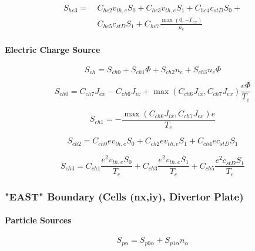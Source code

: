 \documentclass[a4paper,10pt]{report}
\begin{document}
\begin{equation}\begin{split}
S_{he3}= ~ & C_{he2}v_{th,e}S_{0}+C_{he3}v_{th,e}S_{1}+C_{he4}c_{stD}S_{0}+ \\
~ & C_{he5}c_{stD}S_{1}+C_{he7}\frac{\max\left( 0,-\Gamma_{ex}\right) }{n_{e}}
\label{84}
\end{split}\end{equation}

\paragraph{Electric Charge Source}

\begin{equation}
S_{ch}=S_{ch0}+S_{ch1}\Phi+S_{ch2}n_{e}+S_{ch3}n_{e}\Phi   \label{85}
\end{equation}

\begin{equation}
S_{ch0}=C_{ch7}J_{ex}-C_{ch6}J_{ix}+
\max\left(C_{ch6}J_{ix},C_{ch7}J_{ex}\right) \frac{e\Phi}{T_{e}}   \label{86}
\end{equation}
\bigskip

\begin{equation}
S_{ch1}=-\frac{\max\left( C_{ch6}J_{ix},C_{ch7}J_{ex}\right) e}{T_{e}}   \label{87}
\end{equation}

\begin{equation}
S_{ch2}=C_{ch0}ev_{th,e}S_{0}+C_{ch2}ev_{th,e}S_{1}+C_{ch4}ec_{stD}S_{1}
\label{88}
\end{equation}

\begin{equation}
S_{ch3}=C_{ch1}\frac{e^{2}v_{th,e}S_{0}}{T_{e}}+C_{ch3}
\frac{e^{2}v_{th,e}S_{1}}{T_{e}}+C_{ch5}\frac{e^{2}c_{stD}S_{1}}{T_{e}}   \label{89}
\end{equation}

\subsubsection{"EAST" Boundary (Cells (nx,iy), Divertor Plate)}

\paragraph{Particle Sources}

\begin{equation}
S_{p\alpha}=S_{p0\alpha}+S_{p1\alpha}n_{\alpha}   \label{90}
\end{equation}
\end{document}
